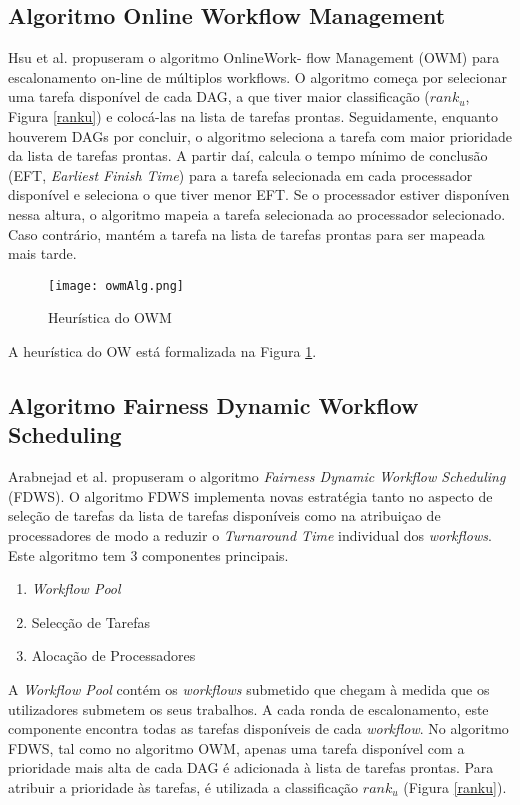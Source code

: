 \subsection{Algoritmo Online Workflow Management}
Hsu et al. \cite{Hsu2011} propuseram o algoritmo OnlineWork- flow Management (OWM) para escalonamento on-line de múltiplos workflows.
O algoritmo começa por selecionar uma tarefa disponível de cada DAG, a que tiver maior classificação ($rank_u$, Figura \ref{ranku}) e colocá-las na lista de tarefas prontas. Seguidamente, enquanto houverem DAGs por concluir, o algoritmo seleciona a tarefa com maior prioridade da lista de tarefas prontas. A partir daí, calcula o tempo mínimo de conclusão (EFT, \textit{Earliest Finish Time}) para a tarefa selecionada em cada processador disponível e seleciona o que tiver menor EFT. Se o processador estiver disponíven nessa altura, o algoritmo mapeia a tarefa selecionada ao processador selecionado. Caso contrário, mantém a tarefa na lista de tarefas prontas para ser mapeada mais tarde.

\begin{figure}[H]
	\centering
	\texttt{[image: owmAlg.png]}
	\caption{Heurística do OWM}
	\label{ownAlg}
\end{figure}

A heurística do OW está formalizada na Figura \ref{ownAlg}.

\subsection{Algoritmo Fairness Dynamic Workflow Scheduling}
Arabnejad et al. \cite{Arabnejad2012} propuseram o algoritmo \textit{Fairness Dynamic Workflow Scheduling} (FDWS). O algoritmo FDWS implementa novas estratégia tanto no aspecto de seleção de tarefas da lista de tarefas disponíveis como na atribuiçao de processadores de modo a reduzir o \textit{Turnaround Time} individual dos \textit{workflows}. Este algoritmo tem 3 componentes principais. 
\begin{enumerate}
	\item \textit{Workflow Pool}
	\item Selecção de Tarefas
	\item Alocação de Processadores
\end{enumerate} 
A \textit{Workflow Pool} contém os \textit{workflows} submetido que chegam à medida que os utilizadores submetem os seus trabalhos. A cada ronda de escalonamento, este componente encontra todas as tarefas disponíveis de cada \textit{workflow}.
No algoritmo FDWS, tal como no algoritmo OWM, apenas uma tarefa disponível com a prioridade mais alta de cada DAG é adicionada à lista de tarefas prontas. Para atribuir a prioridade às tarefas, é utilizada a classificação $rank_u$ (Figura \ref{ranku}).


